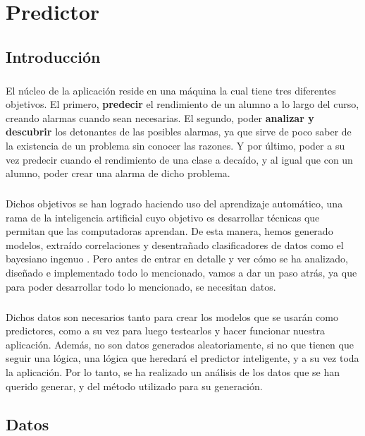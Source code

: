 \chapter{Predictor}

\section{Introducción}
\paragraph{}
El núcleo de la aplicación reside en una máquina la cual tiene tres
diferentes objetivos. El primero, \textbf{predecir} el rendimiento de un alumno
a lo largo del curso, creando alarmas cuando sean necesarias. El
segundo, poder \textbf{analizar y descubrir} los detonantes de las posibles
alarmas, ya que sirve de poco saber de la existencia de un problema
sin conocer las razones. Y por último, poder a su vez predecir cuando
el rendimiento de una clase a decaído, y al igual que con un alumno,
poder crear una alarma de dicho problema.
\paragraph{}
Dichos objetivos se han logrado haciendo uso del aprendizaje
automático, una rama de la inteligencia artificial cuyo objetivo es
desarrollar técnicas que permitan que las computadoras aprendan. De
esta manera, hemos generado modelos, extraído correlaciones y
desentrañado clasificadores de datos como el bayesiano
ingenuo \cite{clasificadorBayesianoIngenuo} . Pero antes de entrar en detalle y ver cómo se ha
analizado, diseñado e implementado todo lo mencionado, vamos a dar un
paso atrás, ya que para poder desarrollar todo lo mencionado, se
necesitan datos.
\paragraph{}
Dichos datos son necesarios tanto para crear los modelos que se usarán
como predictores, como a su vez para luego testearlos y hacer
funcionar nuestra aplicación. Además, no son datos generados
aleatoriamente, si no que tienen que seguir una lógica, una lógica que
heredará el predictor inteligente, y a su vez toda la aplicación. Por
lo tanto, se ha realizado un análisis de los datos que se han querido
generar, y del método utilizado para su generación.

\section{Datos}
